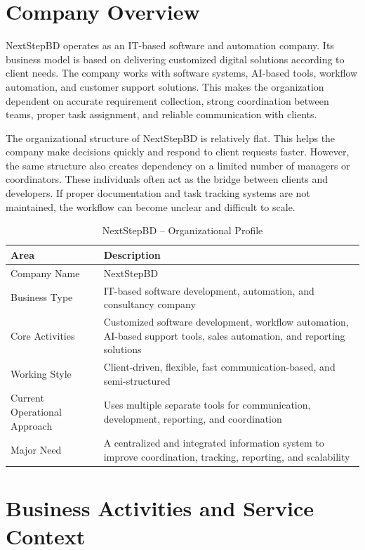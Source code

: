 \documentclass[12pt,a4paper]{report}
\begin{document}
\section{Company Overview}

NextStepBD operates as an IT-based software and automation company. Its business model is based on delivering customized digital solutions according to client needs. The company works with software systems, AI-based tools, workflow automation, and customer support solutions. This makes the organization dependent on accurate requirement collection, strong coordination between teams, proper task assignment, and reliable communication with clients.

The organizational structure of NextStepBD is relatively flat. This helps the company make decisions quickly and respond to client requests faster. However, the same structure also creates dependency on a limited number of managers or coordinators. These individuals often act as the bridge between clients and developers. If proper documentation and task tracking systems are not maintained, the workflow can become unclear and difficult to scale.

\begin{table}[H]
\centering
\renewcommand{\arraystretch}{1.3}
\begin{tabularx}{\textwidth}{|p{4cm}|X|}
\hline
\rowcolor{secondary}
\textbf{Area} & \textbf{Description} \\
\hline
Company Name & NextStepBD \\
\hline
Business Type & IT-based software development, automation, and consultancy company \\
\hline
Core Activities & Customized software development, workflow automation, AI-based support tools, sales automation, and reporting solutions \\
\hline
Working Style & Client-driven, flexible, fast communication-based, and semi-structured \\
\hline
Current Operational Approach & Uses multiple separate tools for communication, development, reporting, and coordination \\
\hline
Major Need & A centralized and integrated information system to improve coordination, tracking, reporting, and scalability \\
\hline
\end{tabularx}
\caption{NextStepBD -- Organizational Profile}
\end{table}

\section{Business Activities and Service Context}
\end{document}
